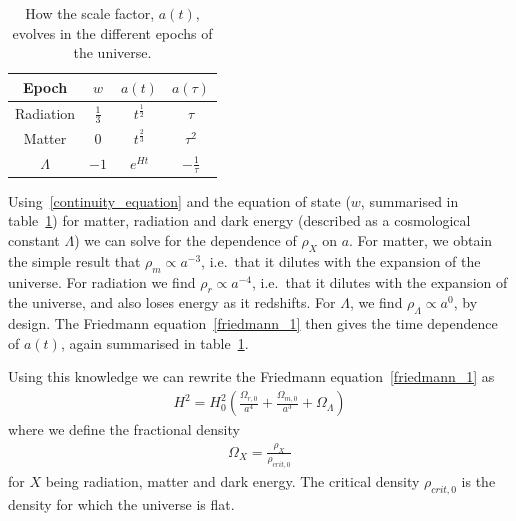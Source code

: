     \begin{table}[h!]
    \begin{center}
        \begin{tabular}{ c c c c }
            Epoch & $w$ & $a(t)$ & $a(\tau)$ \\ 
            \toprule
            Radiation & $\frac{1}{3}$ & $t^{\frac{1}{2}}$ & $\tau$ \\
            Matter & $0$ & $t^{\frac{2}{3}}$ & $\tau^2$ \\
            $\Lambda$ & $-1$ & $e^{Ht}$ & $-\frac{1}{\tau}$
        \end{tabular}\caption{
            How the scale factor, $a(t)$, evolves in the
            different epochs of the universe.
        }\label{lcdm_dep_table}
    \end{center}
    \end{table}



    Using~\eqref{continuity_equation} and the equation of state ($w$, summarised in table~\ref{lcdm_dep_table})
    for matter, radiation and dark energy (described as a cosmological constant $\Lambda$)
    we can solve for the dependence of $\rho_X$ on $a$.
    For matter, we obtain the simple result that $\rho_m\propto a^{-3}$,
    i.e.\ that it dilutes with the expansion of the universe.
    For radiation we find $\rho_r\propto a^{-4}$,
    i.e.\ that it dilutes with the expansion of the universe,
    and also loses energy as it redshifts.
    For $\Lambda$, we find $\rho_\Lambda\propto a^0$, by design.
    The Friedmann equation~\eqref{friedmann_1} then gives the time dependence of
    $a(t)$, again summarised in table~\ref{lcdm_dep_table}.


    Using this knowledge we can
    rewrite the Friedmann equation~\eqref{friedmann_1} as
    \begin{align}\label{friedmann_omega}
        H^2 = H_0^2\left(\frac{\Omega_{r,0}}{a^4}+\frac{\Omega_{m,0}}{a^3}+\Omega_{\Lambda}\right)
    \end{align}
    where we define the fractional density
    \begin{align}
        \Omega_{X} = \frac{\rho_X}{\rho_{crit,0}}
    \end{align}
    for $X$ being radiation, matter and dark energy.
    The critical density $\rho_{crit,0}$ is the density for which the universe is flat.


